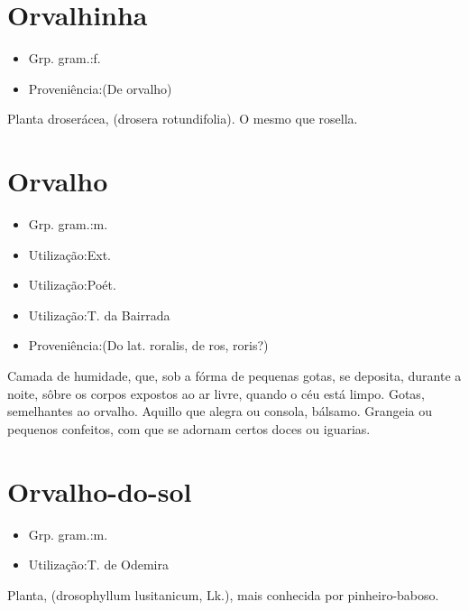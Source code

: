 \section{Orvalhinha}
\begin{itemize}
\item {Grp. gram.:f.}
\end{itemize}
\begin{itemize}
\item {Proveniência:(De \textunderscore orvalho\textunderscore )}
\end{itemize}
Planta droserácea, (\textunderscore drosera rotundifolia\textunderscore ).
O mesmo que \textunderscore rosella\textunderscore .
\section{Orvalho}
\begin{itemize}
\item {Grp. gram.:m.}
\end{itemize}
\begin{itemize}
\item {Utilização:Ext.}
\end{itemize}
\begin{itemize}
\item {Utilização:Poét.}
\end{itemize}
\begin{itemize}
\item {Utilização:T. da Bairrada}
\end{itemize}
\begin{itemize}
\item {Proveniência:(Do lat. \textunderscore roralis\textunderscore , de \textunderscore ros\textunderscore , \textunderscore roris\textunderscore ?)}
\end{itemize}
Camada de humidade, que, sob a fórma de pequenas gotas, se deposita, durante a noite, sôbre os corpos expostos ao ar livre, quando o céu está limpo.
Gotas, semelhantes ao orvalho.
Aquillo que alegra ou consola, bálsamo.
Grangeia ou pequenos confeitos, com que se adornam certos doces ou iguarias.
\section{Orvalho-do-sol}
\begin{itemize}
\item {Grp. gram.:m.}
\end{itemize}
\begin{itemize}
\item {Utilização:T. de Odemira}
\end{itemize}
Planta, (\textunderscore drosophyllum lusitanicum\textunderscore , Lk.), mais conhecida por \textunderscore pinheiro-baboso\textunderscore .
